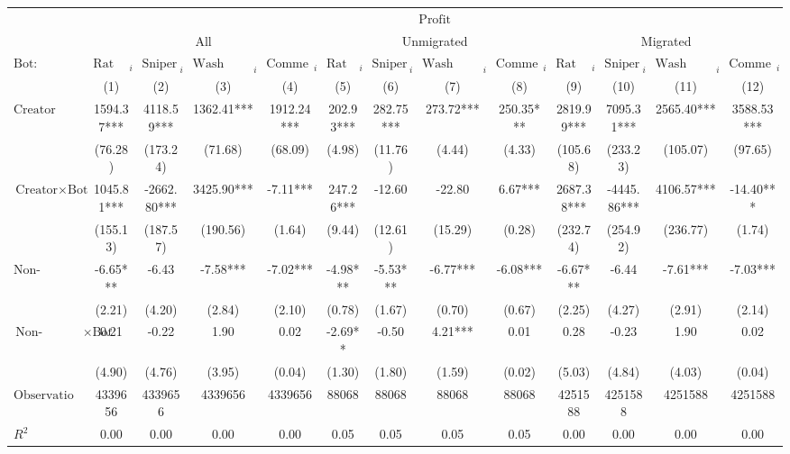 \begin{tabular}{lcccccccccccc}
\hline
 & \multicolumn{12}{c}{$\text{Profit}$} \\
 & \multicolumn{4}{c}{All} & \multicolumn{4}{c}{Unmigrated} & \multicolumn{4}{c}{Migrated} \\
\cmidrule(lr){2-5} \cmidrule(lr){6-9} \cmidrule(lr){10-13}
 $\text{Bot}:$ & $\text{Rat Bot}_{i}$ & $\text{Sniper Bot}_{i}$ & $\text{Wash Trading Bot}_{i}$ & $\text{Comment Bot}_{i}$ & $\text{Rat Bot}_{i}$ & $\text{Sniper Bot}_{i}$ & $\text{Wash Trading Bot}_{i}$ & $\text{Comment Bot}_{i}$ & $\text{Rat Bot}_{i}$ & $\text{Sniper Bot}_{i}$ & $\text{Wash Trading Bot}_{i}$ & $\text{Comment Bot}_{i}$ \\
 & (1) & (2) & (3) & (4) & (5) & (6) & (7) & (8) & (9) & (10) & (11) & (12)\\
\hline
$\text{Creator}$ & 1594.37*** & 4118.59*** & 1362.41*** & 1912.24*** & 202.93*** & 282.75*** & 273.72*** & 250.35*** & 2819.99*** & 7095.31*** & 2565.40*** & 3588.53*** \\
 & (76.28) & (173.24) & (71.68) & (68.09) & (4.98) & (11.76) & (4.44) & (4.33) & (105.68) & (233.23) & (105.07) & (97.65) \\
$\text{Creator} \times \text{Bot}$ & 1045.81*** & -2662.80*** & 3425.90*** & -7.11*** & 247.26*** & -12.60 & -22.80 & 6.67*** & 2687.38*** & -4445.86*** & 4106.57*** & -14.40*** \\
 & (155.13) & (187.57) & (190.56) & (1.64) & (9.44) & (12.61) & (15.29) & (0.28) & (232.74) & (254.92) & (236.77) & (1.74) \\
$\text{Non-Creator}$ & -6.65*** & -6.43 & -7.58*** & -7.02*** & -4.98*** & -5.53*** & -6.77*** & -6.08*** & -6.67*** & -6.44 & -7.61*** & -7.03*** \\
 & (2.21) & (4.20) & (2.84) & (2.10) & (0.78) & (1.67) & (0.70) & (0.67) & (2.25) & (4.27) & (2.91) & (2.14) \\
$\text{Non-Creator} \times \text{Bot}$ & 0.21 & -0.22 & 1.90 & 0.02 & -2.69** & -0.50 & 4.21*** & 0.01 & 0.28 & -0.23 & 1.90 & 0.02 \\
 & (4.90) & (4.76) & (3.95) & (0.04) & (1.30) & (1.80) & (1.59) & (0.02) & (5.03) & (4.84) & (4.03) & (0.04) \\
$\text{Observations}$ & 4339656 & 4339656 & 4339656 & 4339656 & 88068 & 88068 & 88068 & 88068 & 4251588 & 4251588 & 4251588 & 4251588 \\
$R^2$ & 0.00 & 0.00 & 0.00 & 0.00 & 0.05 & 0.05 & 0.05 & 0.05 & 0.00 & 0.00 & 0.00 & 0.00 \\
\hline
\end{tabular}